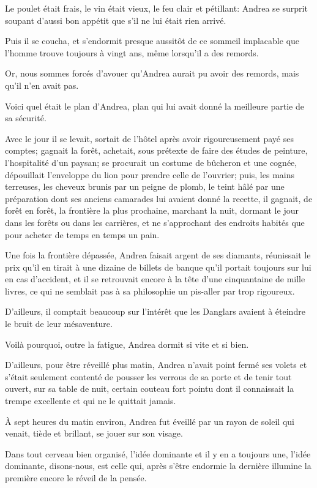 Le poulet était frais, le vin était vieux, le feu clair et pétillant: Andrea se surprit soupant d'aussi bon appétit que s'il ne lui était rien arrivé. 

Puis il se coucha, et s'endormit presque aussitôt de ce sommeil implacable que l'homme trouve toujours à vingt ans, même lorsqu'il a des remords. 

Or, nous sommes forcés d'avouer qu'Andrea aurait pu avoir des remords, mais qu'il n'en avait pas. 

Voici quel était le plan d'Andrea, plan qui lui avait donné la meilleure partie de sa sécurité. 

Avec le jour il se levait, sortait de l'hôtel après avoir rigoureusement payé ses comptes; gagnait la forêt, achetait, sous prétexte de faire des études de peinture, l'hospitalité d'un paysan; se procurait un costume de bûcheron et une cognée, dépouillait l'enveloppe du lion pour prendre celle de l'ouvrier; puis, les mains terreuses, les cheveux brunis par un peigne de plomb, le teint hâlé par une préparation dont ses anciens camarades lui avaient donné la recette, il gagnait, de forêt en forêt, la frontière la plus prochaine, marchant la nuit, dormant le jour dans les forêts ou dans les carrières, et ne s'approchant des endroits habités que pour acheter de temps en temps un pain. 

Une fois la frontière dépassée, Andrea faisait argent de ses diamants, réunissait le prix qu'il en tirait à une dizaine de billets de banque qu'il portait toujours sur lui en cas d'accident, et il se retrouvait encore à la tête d'une cinquantaine de mille livres, ce qui ne semblait pas à sa philosophie un pis-aller par trop rigoureux. 

D'ailleurs, il comptait beaucoup sur l'intérêt que les Danglars avaient à éteindre le bruit de leur mésaventure. 

Voilà pourquoi, outre la fatigue, Andrea dormit si vite et si bien. 

D'ailleurs, pour être réveillé plus matin, Andrea n'avait point fermé ses volets et s'était seulement contenté de pousser les verrous de sa porte et de tenir tout ouvert, sur sa table de nuit, certain couteau fort pointu dont il connaissait la trempe excellente et qui ne le quittait jamais. 

À sept heures du matin environ, Andrea fut éveillé par un rayon de soleil qui venait, tiède et brillant, se jouer sur son visage. 

Dans tout cerveau bien organisé, l'idée dominante et il y en a toujours une, l'idée dominante, disons-nous, est celle qui, après s'être endormie la dernière illumine la première encore le réveil de la pensée. 

